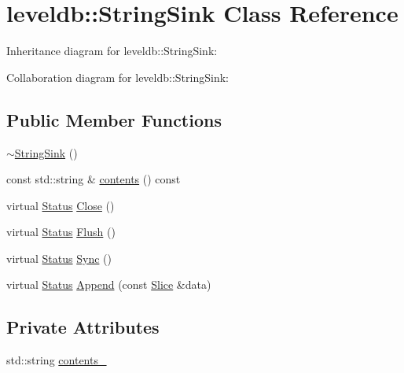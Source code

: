 \hypertarget{classleveldb_1_1_string_sink}{\section{leveldb\-:\-:String\-Sink Class Reference}
\label{classleveldb_1_1_string_sink}
}


Inheritance diagram for leveldb\-:\-:String\-Sink\-:


Collaboration diagram for leveldb\-:\-:String\-Sink\-:
\subsection*{Public Member Functions}
\begin{DoxyCompactItemize}
\item 
\hyperlink{classleveldb_1_1_string_sink_a0cedd3ea3f2c0353f64c8e7509bc8107}{$\sim$\-String\-Sink} ()
\item 
const std\-::string \& \hyperlink{classleveldb_1_1_string_sink_ac6a122614f3a447d2633e5a5725a9613}{contents} () const 
\item 
virtual \hyperlink{classleveldb_1_1_status}{Status} \hyperlink{classleveldb_1_1_string_sink_a40e2142f8078720ecbad8a1d48be6f48}{Close} ()
\item 
virtual \hyperlink{classleveldb_1_1_status}{Status} \hyperlink{classleveldb_1_1_string_sink_af8dc901a44e89b56726bde2782a41ab7}{Flush} ()
\item 
virtual \hyperlink{classleveldb_1_1_status}{Status} \hyperlink{classleveldb_1_1_string_sink_a77f1f2b9797737fbd89211ba0bb9a93e}{Sync} ()
\item 
virtual \hyperlink{classleveldb_1_1_status}{Status} \hyperlink{classleveldb_1_1_string_sink_a10db68412947f16bde307677a663c241}{Append} (const \hyperlink{classleveldb_1_1_slice}{Slice} \&data)
\end{DoxyCompactItemize}
\subsection*{Private Attributes}
\begin{DoxyCompactItemize}
\item 
std\-::string \hyperlink{classleveldb_1_1_string_sink_a1d0cf9c939de3e41d9c45df09297d1f3}{contents\-\_\-}
\end{DoxyCompactItemize}


